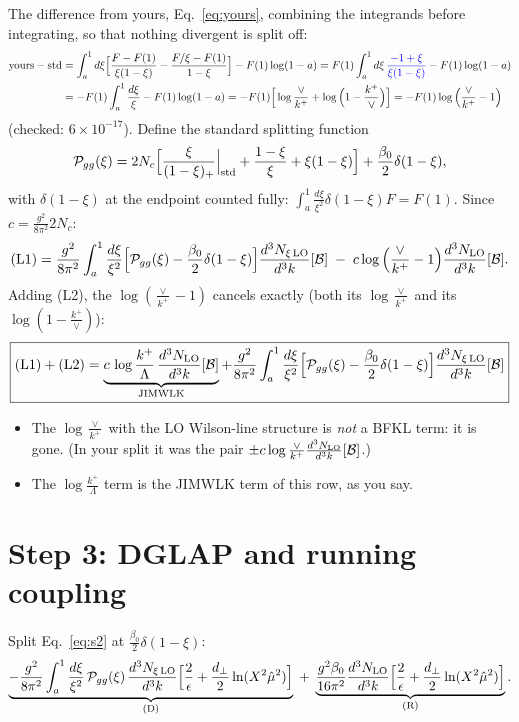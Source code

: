 \documentclass[10pt]{article}
\numberwithin{equation}{section}
\newcommand{\NLO}[1]{\frac{d^3N_{#1}}{d^3k}}
\begin{document}
The difference from yours, Eq.~\eqref{eq:yours}, {\color{blue}combining the integrands before integrating, so that nothing divergent is split off}:
\begin{align}
\text{yours}-\text{std}&=\int_a^1d\xi\Big[\frac{F-F(1)}{\xi(1-\xi)}-\frac{F/\xi-F(1)}{1-\xi}\Big]-F(1)\log(1-a)
=F(1)\int_a^1d\xi\,{\color{blue}\frac{-1+\xi}{\xi(1-\xi)}}-F(1)\log(1-a)\notag\\
&=-F(1)\int_a^1\frac{d\xi}{\xi}-F(1)\log(1-a)=-F(1)\Big[\log\frac{\vee}{k^+}+\log\Big(1-\frac{k^+}{\vee}\Big)\Big]=-F(1)\log\Big(\frac{\vee}{k^+}-1\Big)
\end{align}
(checked: $6\times10^{-17}$). Define the standard splitting function
\begin{equation}
\mathcal P_{gg}(\xi)=2N_c\Big[\frac{\xi}{(1-\xi)_+}\Big|_{\rm std}+\frac{1-\xi}{\xi}+\xi(1-\xi)\Big]+\frac{\beta_0}{2}\delta(1-\xi),
\end{equation}
with $\delta(1-\xi)$ at the endpoint counted fully: $\int_a^1\frac{d\xi}{\xi^2}\delta(1-\xi)F=F(1)$. Since $c=\frac{g^2}{8\pi^2}2N_c$:
\begin{equation}
\text{(L1)}=\frac{g^2}{8\pi^2}\int_a^1\frac{d\xi}{\xi^2}\Big[\mathcal P_{gg}(\xi)-\frac{\beta_0}{2}\delta(1-\xi)\Big]\NLO{\xi\,\rm LO}[\mathcal B]\;-\;c\log\Big(\frac{\vee}{k^+}-1\Big)\NLO{\rm LO}[\mathcal B].
\end{equation}
Adding (L2), the $\log(\frac{\vee}{k^+}-1)$ cancels exactly (both its $\log\frac{\vee}{k^+}$ and its $\log(1-\frac{k^+}{\vee})$):
\begin{equation}
\boxed{\text{(L1)}+\text{(L2)}=\underbrace{c\,\log\frac{k^+}{\Lambda}\,\NLO{\rm LO}[\mathcal B]}_{\rm JIMWLK}+\frac{g^2}{8\pi^2}\int_a^1\frac{d\xi}{\xi^2}\Big[\mathcal P_{gg}(\xi)-\frac{\beta_0}{2}\delta(1-\xi)\Big]\NLO{\xi\,\rm LO}[\mathcal B]}\label{eq:s2}
\end{equation}
\begin{itemize}
\item The $\log\frac{\vee}{k^+}$ with the LO Wilson-line structure is \emph{not} a BFKL term: it is gone. (In your split it was the pair $\pm c\log\frac{\vee}{k^+}\NLO{\rm LO}[\mathcal B]$.)
\item The $\log\frac{k^+}{\Lambda}$ term is the JIMWLK term of this row, as you say.
\end{itemize}

\section{Step 3: DGLAP and running coupling}
Split Eq.~\eqref{eq:s2} at $\frac{\beta_0}{2}\delta(1-\xi)$:
\begin{equation}
\underbrace{-\frac{g^2}{8\pi^2}\int_a^1\frac{d\xi}{\xi^2}\,\mathcal P_{gg}(\xi)\,\NLO{\xi\,\rm LO}\Big[\frac2\epsilon+\frac{d_\perp}{2}\ln(X^2\hat\mu^2)\Big]}_{\rm (D)}\;+\;\underbrace{\frac{g^2\beta_0}{16\pi^2}\NLO{\rm LO}\Big[\frac2\epsilon+\frac{d_\perp}{2}\ln(X^2\hat\mu^2)\Big]}_{\rm (R)} .
\end{equation}
\end{document}

